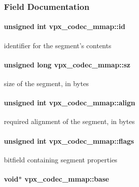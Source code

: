 \subsubsection{\-Field \-Documentation}
\hypertarget{structvpx__codec__mmap_a83f482a223678a60c22362f44e36e8c8}{
\paragraph[{id}]{\setlength{\rightskip}{0pt plus 5cm}unsigned int {\bf vpx\-\_\-codec\-\_\-mmap\-::id}}}
\label{structvpx__codec__mmap_a83f482a223678a60c22362f44e36e8c8}
identifier for the segment's contents \hypertarget{structvpx__codec__mmap_ae6822e6985cef61d2341a8d429bea079}{
\paragraph[{sz}]{\setlength{\rightskip}{0pt plus 5cm}unsigned long {\bf vpx\-\_\-codec\-\_\-mmap\-::sz}}}
\label{structvpx__codec__mmap_ae6822e6985cef61d2341a8d429bea079}
size of the segment, in bytes \hypertarget{structvpx__codec__mmap_a7875d3878f1d58c205f396c1f696987b}{
\paragraph[{align}]{\setlength{\rightskip}{0pt plus 5cm}unsigned int {\bf vpx\-\_\-codec\-\_\-mmap\-::align}}}
\label{structvpx__codec__mmap_a7875d3878f1d58c205f396c1f696987b}
required alignment of the segment, in bytes \hypertarget{structvpx__codec__mmap_afd7f8fed412b7bb524bed8e6ed14400d}{
\paragraph[{flags}]{\setlength{\rightskip}{0pt plus 5cm}unsigned int {\bf vpx\-\_\-codec\-\_\-mmap\-::flags}}}
\label{structvpx__codec__mmap_afd7f8fed412b7bb524bed8e6ed14400d}
bitfield containing segment properties \hypertarget{structvpx__codec__mmap_a0f7580ef4f5680df53c1ef3bd5f66d01}{
\paragraph[{base}]{\setlength{\rightskip}{0pt plus 5cm}void$\ast$ {\bf vpx\-\_\-codec\-\_\-mmap\-::base}}}
